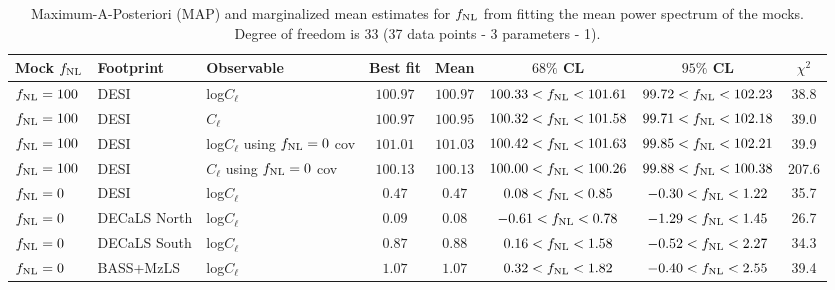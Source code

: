 \begin{table}
  \begin{center}
    \caption{Maximum-A-Posteriori (MAP) and marginalized mean estimates for $f_{\rm NL}$ from fitting the mean power spectrum of the mocks. Degree of freedom is 33 (37 data points - 3 parameters - 1).}
    \label{tab:mocksmcmc}
    \begin{tabular}{lllccccc}
    \hline
    \hline
Mock $f_{\rm NL}$ &  Footprint   &  Observable & 	Best fit  & Mean & $ 68\%$ CL & $ 95\%$ CL & $\chi^{2}$ \\
    \hline
$f_{\rm NL}=100$ & DESI & log$C_{\ell}$                           & $100.97$& $100.97$& $100.33<f_{\rm NL}<101.61$& $ 99.72<f_{\rm NL}<102.23$ &   38.8\\
$f_{\rm NL}=100$ & DESI & $C_{\ell}$                              & $100.97$& $100.95$& $100.32<f_{\rm NL}<101.58$& $ 99.71<f_{\rm NL}<102.18$ &   39.0\\
$f_{\rm NL}=100$ & DESI & log$C_{\ell}$ using $f_{\rm NL}=0$ cov  & $101.01$& $101.03$& $100.42<f_{\rm NL}<101.63$& $ 99.85<f_{\rm NL}<102.21$ &   39.9\\
$f_{\rm NL}=100$ & DESI & $C_{\ell}$ using $f_{\rm NL}=0$ cov     & $100.13$& $100.13$& $100.00<f_{\rm NL}<100.26$& $ 99.88<f_{\rm NL}<100.38$ &  207.6\\
\hline
$f_{\rm NL}=0$ &DESI      &        log$C_{\ell}$                  & $  0.47$& $  0.47$& $  0.08<f_{\rm NL}<  0.85$& $ -0.30<f_{\rm NL}<  1.22$ &   35.7\\
$f_{\rm NL}=0$ & DECaLS North &         log$C_{\ell}$               & $  0.09$& $  0.08$& $ -0.61<f_{\rm NL}<  0.78$& $ -1.29<f_{\rm NL}<  1.45$ &   26.7\\
$f_{\rm NL}=0$ & DECaLS South  &                     log$C_{\ell}$ & $  0.87$& $  0.88$& $  0.16<f_{\rm NL}<  1.58$& $ -0.52<f_{\rm NL}<  2.27$ &   34.3\\
$f_{\rm NL}=0$ & BASS+MzLS  &  log$C_{\ell}$                       & $  1.07$& $  1.07$& $  0.32<f_{\rm NL}<  1.82$& $ -0.40<f_{\rm NL}<  2.55$ &   39.4\\ 
\hline
    \end{tabular}
  \end{center}
\end{table}


